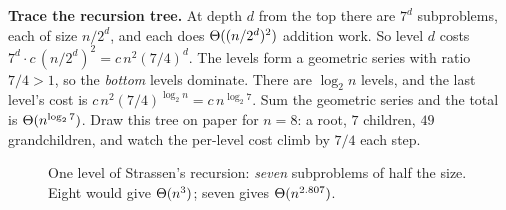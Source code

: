 \begin{labbox}
\textbf{Trace the recursion tree.} At depth $d$ from the top there are $7^d$
subproblems, each of size $n/2^d$, and each does $\Theta((n/2^d)^2)$ addition work.
So level $d$ costs $7^d\cdot c\,(n/2^d)^2=c\,n^2(7/4)^d$. The levels form a
geometric series with ratio $7/4>1$, so the \emph{bottom} levels dominate. There
are $\log_2 n$ levels, and the last level's cost is
$c\,n^2(7/4)^{\log_2 n}=c\,n^{\log_2 7}$. Sum the geometric series and the total is
$\Theta(n^{\log_2 7})$. Draw this tree on paper for $n=8$: a root, $7$ children, $49$
grandchildren, and watch the per-level cost climb by $7/4$ each step.
\end{labbox}

\begin{figure}[h]
\centering
{}
\caption{One level of Strassen's recursion: \emph{seven} subproblems of half the
size. Eight would give $\Theta(n^3)$; seven gives $\Theta(n^{2.807})$.}
\label{ch27:strassen-tree}
\end{figure}

